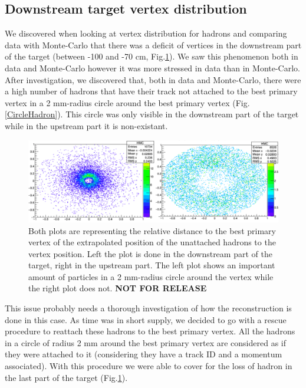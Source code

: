 \documentclass[letterpaper,12pt]{article}
\begin{document}
\subsection{Downstream target vertex distribution}

We discovered when looking at vertex distribution for hadrons and comparing data with Monte-Carlo that there was a deficit of vertices in the downstream part of the target (between -100 and -70 cm, Fig.\ref{VertexDrop}). We saw this phenomenon both in data and Monte-Carlo however it was more stressed in data than in Monte-Carlo. After investigation, we discovered that, both in data and Monte-Carlo, there were a high number of hadrons that have their track not attached to the best primary vertex in a 2 mm-radius circle around the best primary vertex (Fig.\ref{CircleHadron}). This circle was only visible in the downstream part of the target while in the upstream part it is non-existant.

\begin{figure}[!h]
	\includegraphics[scale=0.45]{./gfx/CircleHadron.png}
	\caption{Both plots are representing the relative distance to the best primary vertex of the extrapolated position of the unattached hadrons to the vertex position. Left the plot is done in the downstream part of the target, right in the upstream part. The left plot shows an important amount of particles in a 2 mm-radius circle around the vertex while the right plot does not. \textbf{NOT FOR RELEASE}}
	\label{VertexDrop}
\end{figure}

This issue probably needs a thorough investigation of how the reconstruction is done in this case. As time was in short supply, we decided to go with a rescue procedure to reattach these hadrons to the best primary vertex. All the hadrons in a circle of radius 2 mm around the best primary vertex are considered as if they were attached to it (considering they have a track ID and a momentum associated). With this procedure we were able to cover for the loss of hadron in the last part of the target (Fig.\ref{VertexDrop}).
\end{document}
